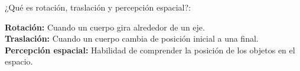 
\question ¿Qué es rotación, traslación y percepción espacial?:
  \begin{solution}[4cm]
    \textbf{Rotación:} Cuando un cuerpo gira alrededor de un eje. \\
    \textbf{Traslación:} Cuando un cuerpo cambia de posición inicial a una
                         final. \\
    \textbf{Percepción espacial:} Habilidad de comprender la posición de los
                                  objetos en el espacio.
  \end{solution}
